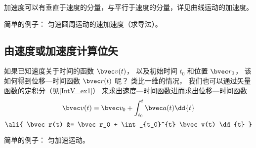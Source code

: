 加速度可以有垂直于速度的分量，与平行于速度的分量，详见曲线运动的加速度。

简单的例子： 匀速圆周运动的速加速度（求导法）。

\subsection{由速度或加速度计算位矢}

如果已知速度关于时间的函数 $\bvec v(t)$， 以及初始时间 $t_0$ 和位置 $\bvec r_0$， 该如何得到位移—时间函数 $\bvec r(t)$ 呢？ 类比一维的情况， 我们也可以通过矢量函数的定积分（见\autoref{IntV_ex1}） 来求出速度—时间函数进而求出位移—时间函数
\begin{equation}\label{VnA_eq7}
\bvec v(t) = \bvec v_0 + \int_{t_0}^{t} \bvec a(t) \dd{t}
\end{equation}
\begin{equation}\label{VnA_eq8}\ali{
\bvec r(t) &= \bvec r_0 + \int_{t_0}^{t} \bvec v(t) \dd{t}
}\end{equation}

简单的例子： 匀加速运动。
